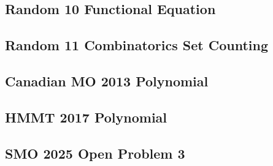 \subsection{Random 10 Functional Equation}


\subsection{Random 11 Combinatorics Set Counting}


\subsection{Canadian MO 2013 Polynomial}


\subsection{HMMT 2017 Polynomial}


\subsection{SMO 2025 Open Problem 3}
